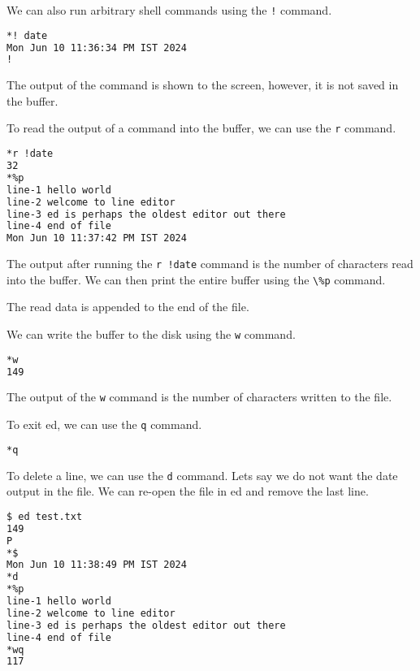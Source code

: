 We can also run arbitrary shell commands using the \lstinline|!| command.

\begin{lstlisting}[language=bash]
*! date
Mon Jun 10 11:36:34 PM IST 2024
!
\end{lstlisting}

The output of the command is shown to the screen,
however, it is not saved in the buffer.

To read the output of a command into the buffer,
we can use the \lstinline|r| command.

\begin{lstlisting}[language=bash]
*r !date
32
*%p
line-1 hello world
line-2 welcome to line editor
line-3 ed is perhaps the oldest editor out there
line-4 end of file
Mon Jun 10 11:37:42 PM IST 2024
\end{lstlisting}

The output after running the \lstinline|r !date| command
is the number of characters read into the buffer.
We can then print the entire buffer using the \lstinline|\%p| command.

The read data is appended to the end of the file.

We can write the buffer
to the disk using the \lstinline|w| command.

\begin{lstlisting}[language=bash]
*w
149
\end{lstlisting}

The output of the \lstinline|w| command is the number of characters written to the file.

To exit ed, we can use the \lstinline|q| command.

\begin{lstlisting}[language=bash]
*q
\end{lstlisting}

To delete a line, we can use the \lstinline|d| command.
Lets say we do not want the date output in the file.
We can re-open the file in ed and remove the last line.

\begin{lstlisting}[language=bash]
$ ed test.txt
149
P
*$
Mon Jun 10 11:38:49 PM IST 2024
*d
*%p
line-1 hello world
line-2 welcome to line editor
line-3 ed is perhaps the oldest editor out there
line-4 end of file
*wq
117
\end{lstlisting}

